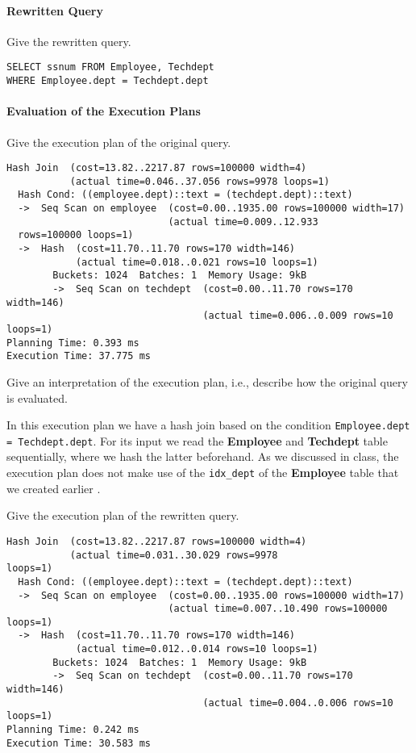 \documentclass[11pt]{scrartcl}
\begin{document}
    \paragraph{Rewritten Query}

    Give the rewritten query.

    \begin{lstlisting}[style=dbtsql]
SELECT ssnum FROM Employee, Techdept
WHERE Employee.dept = Techdept.dept
    \end{lstlisting}

    \paragraph{Evaluation of the Execution Plans}

    Give the execution plan of the original query.

            {\small
    \parskip0pt
    \begin{verbatim}
Hash Join  (cost=13.82..2217.87 rows=100000 width=4)
           (actual time=0.046..37.056 rows=9978 loops=1)
  Hash Cond: ((employee.dept)::text = (techdept.dept)::text)
  ->  Seq Scan on employee  (cost=0.00..1935.00 rows=100000 width=17)
                            (actual time=0.009..12.933
  rows=100000 loops=1)
  ->  Hash  (cost=11.70..11.70 rows=170 width=146)
            (actual time=0.018..0.021 rows=10 loops=1)
        Buckets: 1024  Batches: 1  Memory Usage: 9kB
        ->  Seq Scan on techdept  (cost=0.00..11.70 rows=170 width=146)
                                  (actual time=0.006..0.009 rows=10 loops=1)
Planning Time: 0.393 ms
Execution Time: 37.775 ms
    \end{verbatim}}

    Give an interpretation of the execution plan, i.e., describe how the original query is evaluated.

    In this execution plan we have a hash join based on the condition \texttt{Employee.dept = Techdept.dept}.
    For its input we read the \textbf{Employee} and \textbf{Techdept} table sequentially, where we hash the latter
    beforehand.
    As we discussed in class, the execution plan does not make use of the \texttt{idx\_dept} of the \textbf{Employee}
    table that we created earlier \cite{Schaeler2024}.

    Give the execution plan of the rewritten query.

            {\small
    \parskip0pt\begin{verbatim}
Hash Join  (cost=13.82..2217.87 rows=100000 width=4)
           (actual time=0.031..30.029 rows=9978
loops=1)
  Hash Cond: ((employee.dept)::text = (techdept.dept)::text)
  ->  Seq Scan on employee  (cost=0.00..1935.00 rows=100000 width=17)
                            (actual time=0.007..10.490 rows=100000 loops=1)
  ->  Hash  (cost=11.70..11.70 rows=170 width=146)
            (actual time=0.012..0.014 rows=10 loops=1)
        Buckets: 1024  Batches: 1  Memory Usage: 9kB
        ->  Seq Scan on techdept  (cost=0.00..11.70 rows=170 width=146)
                                  (actual time=0.004..0.006 rows=10 loops=1)
Planning Time: 0.242 ms
Execution Time: 30.583 ms
    \end{verbatim}}
\end{document}
